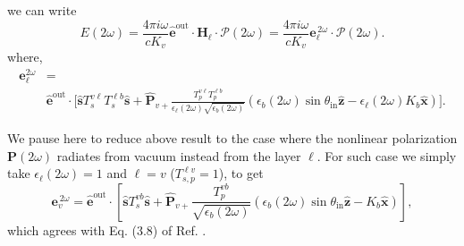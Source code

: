 we can write
\begin{equation*}\label{r10}
E(2\omega) = \frac{4\pi i \omega}{cK_{v}}
\hat{\mathbf{e}}^{\mathrm{out}}\cdot
\mathbf{H}_{\ell}\cdot
\boldsymbol{\mathcal{P}}(2\omega) 
= \frac{4\pi i\omega}{cK_{v}}
  \mathbf{e}^{\,2\omega}_{\ell}\cdot\boldsymbol{\mathcal{P}}(2\omega). 
\end{equation*}
where,
\begin{equation}\label{r12}
\begin{split}
\mathbf{e}^{2\omega}_{\ell} &= \\ &\hat{\mathbf{e}}^{\mathrm{out}}\cdot
\Bigg[
\hat{\mathbf{s}}T_{s}^{v\ell}T_{s}^{\ell b}\hat{\mathbf{s}} + 
\hat{\mathbf{P}}_{v+}
\frac{T^{v\ell}_{p}T^{\ell b}_{p}}
     {\epsilon_{\ell}({2\omega})\sqrt{\epsilon_{b}(2\omega)}}
\left(
  \epsilon_{b}(2\omega)\sin\theta_{\mathrm{in}}\hat{\mathbf{z}}
- \epsilon_{\ell}(2\omega)K_{b}\hat{\mathbf{x}}
\right)
\Bigg]
.
\end{split}
\end{equation}  

We pause here to reduce above result to the case where the nonlinear
polarization $\mathbf{P}(2\omega)$ radiates from vacuum instead from the layer
$\ell$. For such case we simply take $\epsilon_{\ell}(2\omega)=1$ and $\ell=v$
($T^{\ell v}_{s,p}=1$), to get
\begin{equation}\label{r13}
\mathbf{e}^{\,2\omega}_{v} = \hat{\mathbf{e}}^{\mathrm{out}}
\cdot\left[
\hat{\mathbf{s}}T_s^{v b}\hat{\mathbf{s}} + \hat{\mathbf{P}}_{v+}
\frac{T^{v b}_{p}}{\sqrt{\epsilon_{b}(2\omega)}}
\left(
  \epsilon_{b}(2\omega)\sin\theta_{\mathrm{in}}\hat{\mathbf{z}}
  - K_{b}\hat{\mathbf{x}}
\right) 
\right] 
,
\end{equation}
which agrees with Eq. (3.8) of Ref. \cite{mizrahiJOSA88}.

